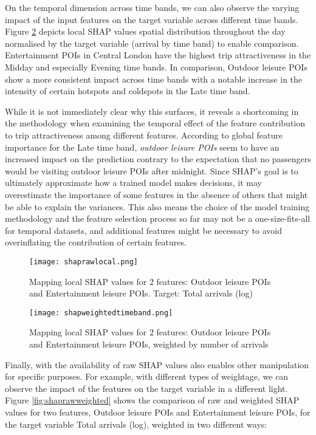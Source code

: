 On the temporal dimension across time bands, we can also observe the varying impact of the input features on the target variable across different time bands. Figure \ref{fig:shapweightedtimeband} depicts local SHAP values spatial distribution throughout the day normalised by the target variable (arrival by time band) to enable comparison. Entertainment POIs in Central London have the highest trip attractiveness in the Midday and especially Evening time bands. In comparison, Outdoor leisure POIs show a more consistent impact across time bands with a notable increase in the intensity of certain hotspots and coldspots in the Late time band. 

While it is not immediately clear why this surfaces, it reveals a shortcoming in the methodology when examining the temporal effect of the feature contribution to trip attractiveness among different features. According to global feature importance for the Late time band, \textit{outdoor leisure POIs} seem to have an increased impact on the prediction contrary to the expectation that no passengers would be visiting outdoor leisure POIs after midnight. Since SHAP's goal is to ultimately approximate how a trained model makes decisions, it may overestimate the importance of some features in the absence of others that might be able to explain the variances. This also means the choice of the model training methodology and the feature selection process so far may not be a one-size-fits-all for temporal datasets, and additional features might be necessary to avoid overinflating the contribution of certain features. 

\begin{figure}[ht]
    \centering
    \texttt{[image: shaprawlocal.png]}
    \captionsetup{justification=centering}
    \caption{Mapping local SHAP values for 2 features: Outdoor leisure POIs and Entertainment leisure POIs. Target: Total arrivals (log)}
    \label{fig:shapraw}
\end{figure}

\begin{figure}[ht]
    \centering
    \texttt{[image: shapweightedtimeband.png]}
    \captionsetup{justification=centering}
    \caption{Mapping local SHAP values for 2 features: Outdoor leisure POIs and Entertainment leisure POIs, weighted by number of arrivals}
    \label{fig:shapweightedtimeband}
\end{figure}

Finally, with the availability of raw SHAP values also enables other manipulation for specific purposes. For example, with different types of weightage, we can observe the impact of the features on the target variable in a different light. Figure \ref{fig:shaprawweighted} shows the comparison of raw and weighted SHAP values for two features, Outdoor leisure POIs and Entertainment leisure POIs, for the target variable Total arrivals (log), weighted in two different ways:

